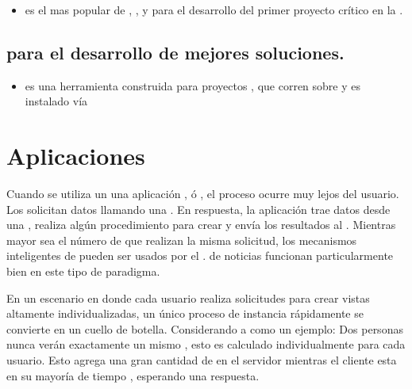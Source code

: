 \begin{itemize}
	\item \textbf{\bootstrap} es el \frameworkPC mas popular de \htmlNAME, \cssNAME, y \javaScriptNAME para el desarrollo del primer proyecto \mobile crítico en la \webINT \cite{technology_bootstrap}.
\end{itemize}

\subsection{\tools para el desarrollo de mejores soluciones.}
\begin{itemize}
	\item \textbf{\grunttool} es una herramienta \commandLine \taskBased construida para proyectos \javaScriptNAME, que corren sobre \nodejsNAME y es instalado vía \npm \cite{technology_gruntjs}
\end{itemize}


\section{Aplicaciones \webINT}

Cuando se utiliza un \backend \running una aplicación \javaNAME, \phpNAME ó \rails, el proceso ocurre muy lejos del usuario. Los \clientsAS solicitan datos llamando una \uri. En respuesta, la aplicación trae datos desde una \dataBaseDB, realiza algún procedimiento para crear \htmlNAME y envía los resultados al \clientAS. Mientras mayor sea el número de \clientsAS que realizan la misma solicitud, los mecanismos inteligentes de \caching pueden ser usados por el \serverAS. \sites de noticias funcionan particularmente bien en este tipo de paradigma.

En un escenario en donde cada usuario realiza solicitudes para crear vistas altamente individualizadas, un único proceso de instancia rápidamente se convierte en un cuello de botella. Considerando a \facebook como un ejemplo: Dos personas nunca verán exactamente un mismo \facebookwall, esto es calculado individualmente para cada usuario. Esto agrega una gran cantidad de \stress en el servidor mientras el cliente esta en su mayoría de tiempo \idle, esperando una respuesta.

